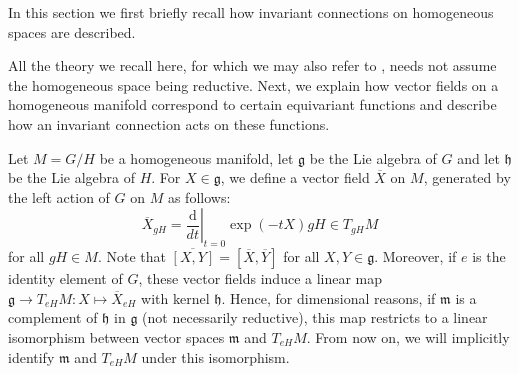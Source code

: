 \documentclass{amsart}
\theoremstyle{plain}
\theoremstyle{remark}
\newcommand\g{{\mathfrak{g}}}
\newcommand\h{{\mathfrak{h}}}
\newcommand\m{{\mathfrak{m}}}
\newcommand\sd{\mathrm{d}}
\begin{document}
In this section we first briefly recall how invariant connections on homogeneous spaces are described. {All the theory we recall here, for which we may also refer to  \cite{KobayashiNomizu1963, KobayashiNomizu1969}, needs not assume the homogeneous space being reductive. Next, we explain how vector fields on a homogeneous manifold correspond to certain equivariant functions and describe how an invariant connection acts on these functions. %

Let $M = G/H$ be a homogeneous manifold, let $\g$ be the Lie algebra of $G$ and let $\h$ be the Lie algebra of $H$. For  $X\in \g$, we define a vector field $\overline{X}$ on $M$, generated by the left action of $G$ on $M$ as follows:
\begin{equation*}
\overline{X}_{gH} = \left.\frac{\sd}{d t}\right|_{t=0} \exp(-tX)gH \in T_{gH}M
\end{equation*}
for all $gH \in M$. Note that $\overline{[X,Y]} = [\overline{X},\overline{Y}]$ for all $X,Y\in \g$. Moreover, if $e$ is the identity element of $G$, these vector fields induce a linear map $\g \to T_{eH}M: X \mapsto \overline{X}_{eH}$ with kernel $\h$. Hence, for dimensional reasons, if $\m$ is a complement of $\h$ in $\g$ (not necessarily reductive), this map restricts to a linear isomorphism between vector spaces  $\m$ and $T_{eH}M$. From now on, we will implicitly identify  $\m$ and $T_{eH}M$ under this isomorphism.

}
\end{document}
